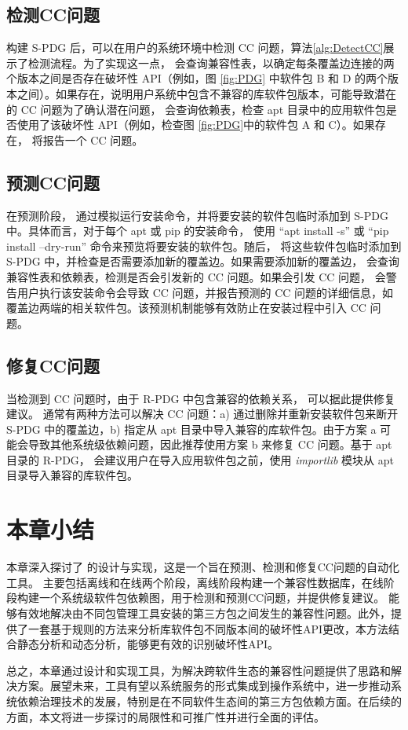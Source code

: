 \subsection{检测CC问题}\label{4.2.2}
构建 S-PDG 后，\tool{}可以在用户的系统环境中检测 CC 问题，算法\ref{alg:DetectCC}展示了检测流程。为了实现这一点，\tool{} 会查询兼容性表，以确定每条覆盖边连接的两个版本之间是否存在破坏性 API（例如，图 \ref{fig:PDG} 中软件包 B 和 D 的两个版本之间）。如果存在，说明用户系统中包含不兼容的库软件包版本，可能导致潜在的 CC 问题为了确认潜在问题，\tool{} 会查询依赖表，检查 apt 目录中的应用软件包是否使用了该破坏性 API（例如，检查图 \ref{fig:PDG}中的软件包 A 和 C）。如果存在，\tool{} 将报告一个 CC 问题。


\subsection{预测CC问题}\label{4.2.3}
在预测阶段，\tool{} 通过模拟运行安装命令，并将要安装的软件包临时添加到 S-PDG 中。具体而言，对于每个 apt 或 pip 的安装命令，\tool{} 使用 “apt install -s” 或 “pip install --dry-run” 命令来预览将要安装的软件包。随后，\tool{} 将这些软件包临时添加到 S-PDG 中，并检查是否需要添加新的覆盖边。如果需要添加新的覆盖边，\tool{} 会查询兼容性表和依赖表，检测是否会引发新的 CC 问题。如果会引发 CC 问题，\tool{} 会警告用户执行该安装命令会导致 CC 问题，并报告预测的 CC 问题的详细信息，如覆盖边两端的相关软件包。该预测机制能够有效防止在安装过程中引入 CC 问题。

\subsection{修复CC问题}\label{4.2.4}
当检测到 CC 问题时，由于 R-PDG 中包含兼容的依赖关系，\tool{} 可以据此提供修复建议。
通常有两种方法可以解决 CC 问题：a) 通过删除并重新安装软件包来断开 S-PDG 中的覆盖边，b) 指定从 apt 目录中导入兼容的库软件包。由于方案 a 可能会导致其他系统级依赖问题，因此\tool{}推荐使用方案 b 来修复 CC 问题。基于 apt 目录的 R-PDG，\tool{} 会建议用户在导入应用软件包之前，使用 \textit{importlib} 模块从 apt 目录导入兼容的库软件包。

\section{本章小结}
本章深入探讨了 \tool{}的设计与实现，这是一个旨在预测、检测和修复CC问题的自动化工具。 \tool{}主要包括离线和在线两个阶段，离线阶段构建一个兼容性数据库，在线阶段构建一个系统级软件包依赖图，用于检测和预测CC问题，并提供修复建议。\tool{} 能够有效地解决由不同包管理工具安装的第三方包之间发生的兼容性问题。此外，\tool{}提供了一套基于规则的方法来分析库软件包不同版本间的破坏性API更改，本方法结合静态分析和动态分析，能够更有效的识别破坏性API。

总之，本章通过设计和实现\tool{}工具，为解决跨软件生态的兼容性问题提供了思路和解决方案。展望未来，\tool{}工具有望以系统服务的形式集成到操作系统中，进一步推动系统依赖治理技术的发展，特别是在不同软件生态间的第三方包依赖方面。在后续的方面，本文将进一步探讨\tool{}的局限性和可推广性并进行全面的评估。